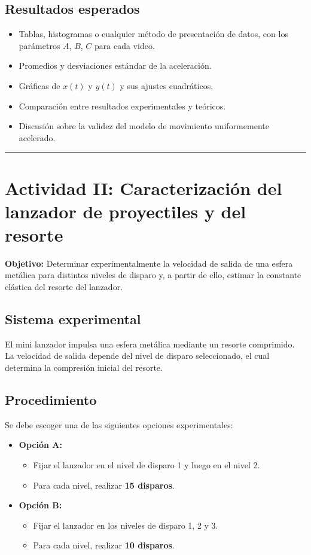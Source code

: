 \subsection*{Resultados esperados}

\begin{itemize}
\item Tablas, histogramas o cualquier método de presentación de datos, con los parámetros $A$, $B$, $C$ para cada video.
\item Promedios y desviaciones estándar de la aceleración.
\item Gráficas de $x(t)$ y $y(t)$ y sus ajustes cuadráticos.
\item Comparación entre resultados experimentales y teóricos.
\item Discusión sobre la validez del modelo de movimiento uniformemente acelerado.
\end{itemize}

\rule{\textwidth}{1pt}

\section*{Actividad II: Caracterización del lanzador de proyectiles y del resorte}

\textbf{Objetivo:} Determinar experimentalmente la velocidad de salida de una esfera metálica para distintos niveles de disparo y, a partir de ello, estimar la constante elástica del resorte del lanzador.

\subsection*{Sistema experimental}

El mini lanzador impulsa una esfera metálica mediante un resorte comprimido. La velocidad de salida depende del nivel de disparo seleccionado, el cual determina la compresión inicial del resorte.

\subsection*{Procedimiento}

Se debe escoger una de las siguientes opciones experimentales:

\begin{itemize}
\item \textbf{Opción A:}
  \begin{itemize}
  \item Fijar el lanzador en el nivel de disparo 1 y luego en el nivel 2.
  \item Para cada nivel, realizar \textbf{15 disparos}.
  \end{itemize}

\item \textbf{Opción B:}
  \begin{itemize}
  \item Fijar el lanzador en los niveles de disparo 1, 2 y 3.
  \item Para cada nivel, realizar \textbf{10 disparos}.
  \end{itemize}
\end{itemize}

